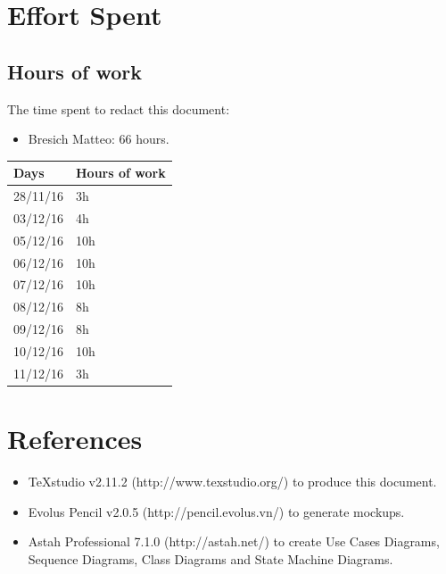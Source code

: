 \documentclass{article}
\begin{document}
	\section{Effort Spent}
		\subsection{Hours of work} The time spent to redact this document:
		\begin{itemize}
			\item Bresich Matteo: 66 hours.
		\end{itemize}
		
		\begin{center}
			\begin{tabular}{ | l | l |}
				\hline
				Days & Hours of work\\ \hline
				28/11/16 & 3h\\\hline
				03/12/16 & 4h\\\hline
				05/12/16 & 10h\\\hline
				06/12/16 & 10h\\\hline
				07/12/16 & 10h\\\hline
				08/12/16 & 8h\\\hline
				09/12/16 & 8h\\\hline
				10/12/16 & 10h\\\hline
				11/12/16 & 3h\\\hline
				
			\end{tabular}
		\end{center}
	\section{References}
		\begin{itemize}
			\item TeXstudio v2.11.2 (http://www.texstudio.org/) to produce this document.
			\item Evolus Pencil v2.0.5 (http://pencil.evolus.vn/) to generate mockups.
			\item Astah Professional 7.1.0 (http://astah.net/) to create Use Cases Diagrams, Sequence Diagrams, Class Diagrams and State Machine Diagrams.
		\end{itemize}
\end{document}

